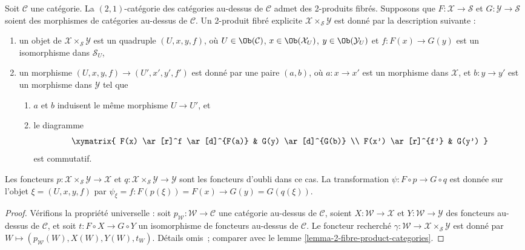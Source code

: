 \begin{lemma}
\label{lemma-2-product-categories-over-C}
Soit $\mathcal{C}$ une catégorie. La $(2, 1)$-catégorie des catégories
au-dessus de $\mathcal{C}$ admet des 2-produits fibrés. Supposons que $F : \mathcal{X} \to \mathcal{S}$ et $G : \mathcal{Y} \to \mathcal{S}$ soient des
morphismes de catégories au-dessus de $\mathcal{C}$. Un 2-produit fibré explicite
$\mathcal{X} \times_\mathcal{S}\mathcal{Y}$ est donné par la description
suivante :
\begin{enumerate}
\item un objet de $\mathcal{X} \times_\mathcal{S} \mathcal{Y}$ est un
quadruple $(U, x, y, f)$, où $U \in \Ob(\mathcal{C})$, $x\in \Ob(\mathcal{X}_U)$, $y\in \Ob(\mathcal{Y}_U)$ et $f : F(x) \to G(y)$ est un
isomorphisme dans $\mathcal{S}_U$,
\item un morphisme $(U, x, y, f) \to (U', x', y', f')$ est donné par une paire
$(a, b)$, où $a : x \to x'$ est un morphisme dans $\mathcal{X}$, et $b : y \to y'$ est un morphisme dans $\mathcal{Y}$ tel que
\begin{enumerate}
\item $a$ et $b$ induisent le même morphisme $U \to U'$, et
\item le diagramme
$$
\xymatrix{
F(x) \ar[r]^f \ar[d]^{F(a)} & G(y) \ar[d]^{G(b)} \\
F(x') \ar[r]^{f'} & G(y')
}
$$
est commutatif.
\end{enumerate}
\end{enumerate}
Les foncteurs $p : \mathcal{X} \times_\mathcal{S}\mathcal{Y} \to \mathcal{X}$
et $q : \mathcal{X} \times_\mathcal{S}\mathcal{Y} \to \mathcal{Y}$ sont les
foncteurs d'oubli dans ce cas. La transformation $\psi : F \circ p \to
G \circ q$ est donnée sur l'objet $\xi = (U, x, y, f)$ par $\psi_\xi = f : F(p(\xi)) = F(x) \to G(y) = G(q(\xi))$.
\end{lemma}

\begin{proof}
Vérifions la propriété universelle : soit $p_\mathcal{W} : \mathcal{W}\to \mathcal{C}$ une catégorie au-dessus de $\mathcal{C}$, soient $X : \mathcal{W} \to \mathcal{X}$ et $Y : \mathcal{W} \to \mathcal{Y}$ des foncteurs au-dessus de
$\mathcal{C}$, et soit $t : F \circ X \to G \circ Y$ un isomorphisme de
foncteurs au-dessus de $\mathcal{C}$. Le foncteur recherché $\gamma : \mathcal{W} \to \mathcal{X} \times_\mathcal{S} \mathcal{Y}$ est donné par $W \mapsto (p_\mathcal{W}(W), X(W), Y(W), t_W)$. Détails omis ; comparer avec le lemme
\ref{lemma-2-fibre-product-categories}.
\end{proof}


